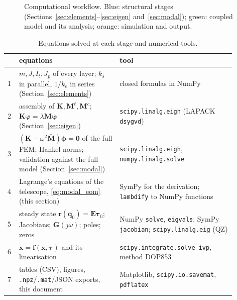 \documentclass[10pt,a4paper]{article}
\numberwithin{equation}{section}
\begin{document}
\begin{figure}[H]
{}
\caption{Computational workflow. Blue: structural stages (Sections~\ref{sec:elements}--\ref{sec:eigen} and~\ref{sec:modal}); green: coupled model and its analysis; orange: simulation and output.}\label{fig:flow}\end{figure}
\begin{table}[H]\centering\small
\caption{Equations solved at each stage and numerical tools.}\label{tab:stages}
\begin{tabular}{p{0.04\linewidth}p{0.4\linewidth}p{0.46\linewidth}}\toprule
& equations & tool \\ \midrule
1 & $m, J, I_t, J_p$ of every layer; $k_s$ in parallel, $1/k_e$ in series (Section~\ref{sec:elements}) & closed formulas in NumPy \\
2 & assembly of $\mathbf K,\mathbf M^{\ell},\mathbf M^{c}$; $\mathbf K\boldsymbol\varphi = \lambda\mathbf M\boldsymbol\varphi$ (Section~\ref{sec:eigen}) & \texttt{scipy.linalg.eigh} (LAPACK \texttt{dsygvd}) \\
3 & $(\mathbf K - \omega^2\bar{\mathbf M})\boldsymbol\phi = \mathbf 0$ of the full FEM; Hankel norms; validation against the full model (Section~\ref{sec:modal}) & \texttt{scipy.linalg.eigh}, \texttt{numpy.linalg.solve} \\
4 & Lagrange's equations of the telescope, \eqref{eq:modal_eom} (this section) & SymPy for the derivation; \texttt{lambdify} to NumPy functions \\
5 & steady state $\mathbf r(\mathbf q_0) = \mathbf E\boldsymbol\tau_0$; Jacobians; $\mathbf G(j\omega)$; poles; zeros & NumPy \texttt{solve}, \texttt{eigvals}; SymPy \texttt{jacobian}; \texttt{scipy.linalg.eig} (QZ) \\
6 & $\dot{\mathbf x} = \mathbf f(\mathbf x,\boldsymbol\tau)$ and its linearisation & \texttt{scipy.integrate.solve\_ivp}, method DOP853 \\
7 & tables (CSV), figures, \texttt{.npz}/\texttt{.mat}/JSON exports, this document & Matplotlib, \texttt{scipy.io.savemat}, \texttt{pdflatex} \\ \bottomrule
\end{tabular}\end{table}
\end{document}
